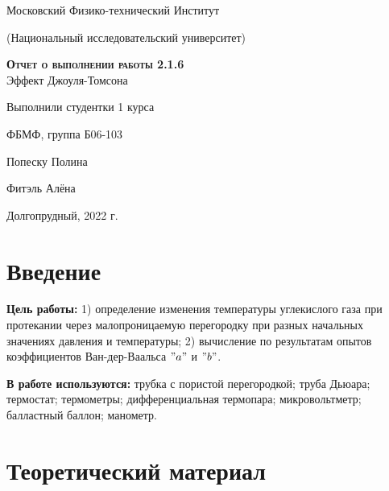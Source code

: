 \documentclass[12pt,a4paper]{article}
\begin{document}
\begin{titlepage}
  \begin{center}
    \huge
    Московский Физико-технический Институт
    
    (Национальный исследовательский университет)
    \vspace{0.5cm}

   
    \vspace{0.25cm}
 
    \vfill
 
    \vfill

    \textsc{\bf{Отчет о выполнении работы 2.1.6}}\\[3mm]
    
    {\LARGE  Эффект Джоуля-Томсона}
  \bigskip
    \vfill
    
\end{center}
\vfill
\begin{flushright}

    Выполнили студентки 1 курса
    
    ФБМФ, группа Б06-103

    Попеску Полина
    
    
    Фитэль Алёна

\end{flushright}
\bigskip


\vfill

\begin{center}
  Долгопрудный, 2022 г.
\end{center}
\end{titlepage}

\section{Введение}

\textbf{Цель работы:} 1) определение изменения температуры углекислого газа при протекании через малопроницаемую перегородку при разных начальных значениях давления и температуры; 2) вычисление по результатам опытов коэффициентов Ван-дер-Ваальса $"a"$ и $"b"$.

\textbf{В работе используются:} трубка с пористой перегородкой; труба Дьюара; термостат; термометры; дифференциальная термопара; микровольтметр; балластный баллон; манометр.

\section{Теоретический материал}
\end{document}
